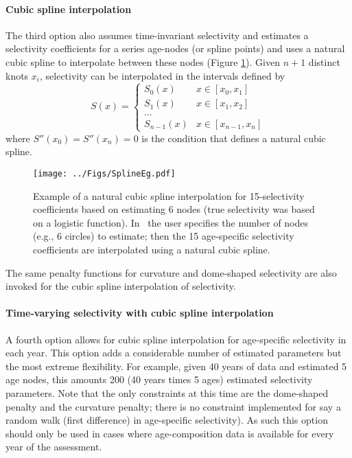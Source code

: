 \paragraph{Cubic spline interpolation}
The third option also assumes time-invariant selectivity and estimates a selectivity coefficients for a series age-nodes (or spline points) and uses a natural cubic spline to interpolate between these nodes (Figure \ref{Fig2}). Given $n+1$ distinct knots $x_i$, selectivity can be interpolated in the intervals defined by
\[
S(x) = \begin{cases}
	S_0(x) & x \in [x_0,x_1]\\
	S_1(x) & x \in [x_1,x_2]\\
	...\\
	S_{n-1}(x) & x \in [x_{n-1},x_n]
\end{cases}
\]
where  $S''(x_0) = S''(x_n)=0$  is the condition that defines a natural cubic spline.
\begin{figure}
	\centering
	\texttt{[image: ../Figs/SplineEg.pdf]}\\
	\caption{Example of a natural cubic spline interpolation for 15-selectivity coefficients based on estimating 6 nodes (true selectivity was based on a logistic function).  In \iscam\ the user specifies the number of nodes (e.g., 6 circles) to estimate; then the 15 age-specific selectivity coefficients are interpolated using a natural cubic spline.}\label{Fig2}
\end{figure}

The same penalty functions for curvature and dome-shaped selectivity are also invoked for the cubic spline interpolation of selectivity.

\paragraph{Time-varying selectivity with cubic spline interpolation} A fourth option allows for cubic spline interpolation for age-specific selectivity  in each year.  This option adds a considerable number of estimated parameters but the most extreme flexibility.  For example, given 40 years of data and estimated 5 age nodes, this amounts 200 (40 years times 5 ages) estimated selectivity parameters.  Note that the only constraints at this time are the dome-shaped penalty and the curvature penalty; there is no constraint implemented for say a random walk (first difference) in age-specific selectivity).  As such this option should only be used in cases where age-composition data is available for every year of the assessment.

